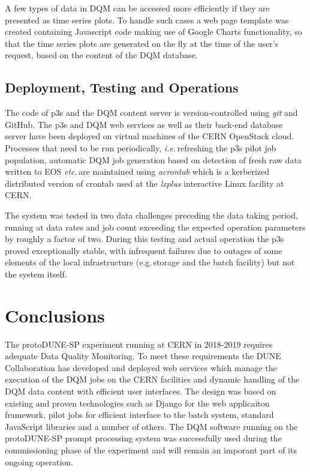 \documentclass[pdftex,12pt,letter]{article}
\newcommand{\pd}{protoDUNE\xspace}
\begin{document}
A few types of data in DQM can be accessed more efficiently if they are presented as time
series plots. To handle such cases a web page template was created containing
Javascript code making use of Google Charts functionality, so that the time series
plots are generated on the fly at the time of the user's request, based on the content
of the DQM database.

\subsection{Deployment, Testing and Operations}

The code of p3s and the DQM content server is version-controlled using \textit{git}
and GitHub. The p3s and DQM web services as well as their back-end database server have been deployed on
virtual machines of the CERN OpenStack cloud. Processes that need to be run periodically,
\textit{i.e.}\,refreshing the p3s pilot job population, automatic DQM job generation based on detection
of fresh raw data written to EOS \textit{etc.}\,are maintained using \textit{acrontab} which is a kerberized
distributed version of crontab used at the \textit{lxplus} interactive Linux facility at CERN.

The system was tested in two data challenges preceding the data taking period, running
at data rates and job count exceeding the expected operation parameters by roughly
a factor of two. During this testing and actual operation the p3s proved exceptionally stable,
with infrequent failures due to outages of some elements of the local infrastructure
(e.g.\,storage and the batch facility) but not the system itself.

\section{Conclusions}

The \pd-SP experiment running at CERN in 2018-2019 requires adequate Data
Quality Monitoring. To meet these requirements the DUNE Collaboration has developed
and deployed web services which manage the execution of the DQM jobs on the CERN
facilities and dynamic handling of the DQM data content with efficient user interfaces.
The design was based on existing and proven technologies such as Django
for the web applicaiton framework,  pilot jobs for efficient interface to
the batch system, standard  JavaScript libraries and a number of others. The DQM software
running on the \pd-SP prompt processing system was  successfully used during
the commissioning phase of the experiment and will remain an imporant part
of its ongoing operation.
\end{document}

